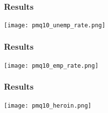 \begin{frame}

    \label{unemp_rate_result}
    \frametitle{Results} %
    \framesubtitle{}  %
    \rmfamily %
    
    \begin{center} %
        \texttt{[image: pmq10\_unemp\_rate.png]}
    \end{center}

    \hyperlink{perc_comparison_1}{}
    \hyperlink{ta_1}{}
    \hyperlink{presc_1}{}

\end{frame}


\begin{frame}

    \label{emp_rate_result}
    \frametitle{Results} %
    \framesubtitle{}  %
    \rmfamily %
    
    \begin{center} %
        \texttt{[image: pmq10\_emp\_rate.png]}
    \end{center}

    \hyperlink{perc_comparison_2}{}
    \hyperlink{ta_2}{}
    \hyperlink{presc_2}{}

\end{frame}

\begin{frame}

    \label{heroin_result}
    \frametitle{Results} %
    \framesubtitle{}  %
    \rmfamily %
    
    \begin{center} %
        \texttt{[image: pmq10\_heroin.png]}
    \end{center}

    \hyperlink{table_heroin}{}

\end{frame}


